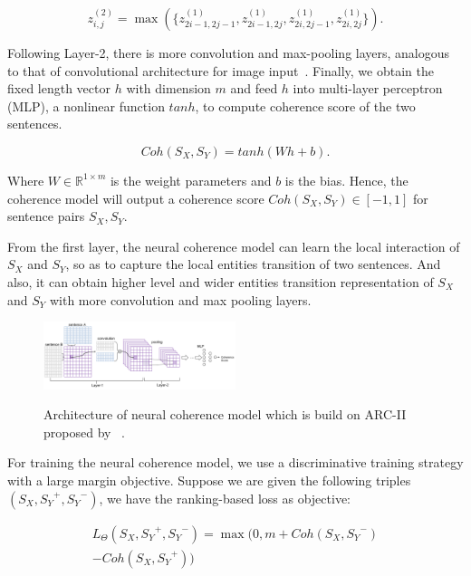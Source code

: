 \documentclass[letterpaper]{article} %
\begin{document}
	
	\begin{equation}
	z_{i,j}^{(2)} = \max(\{z_{2i-1,2j-1}^{(1)}, z_{2i-1,2j}^{(1)},z_{2i,2j-1}^{(1)},z_{2i,2j}^{(1)}\}). 
	\label{e:2dpool}
	\end{equation}
	
	Following Layer-2, there is more convolution and  max-pooling layers, analogous to that of convolutional architecture for image input~\cite{cnn}. Finally, we obtain the fixed length vector $h$ with dimension $m$ and feed $h$ into multi-layer perceptron (MLP), a nonlinear function $tanh$, to compute coherence score of the two sentences.
	
	\begin{equation}
	Coh(S_X,S_Y) = tanh(W  h+b). 
	\end{equation}
	
	\noindent Where  $ W \in \mathbb{R}^{1 \times m}$ is the weight parameters and $b$ is the bias. Hence, the coherence model will output a coherence score  $Coh(S_X, S_Y) \in [-1,1]$ for sentence pairs $S_X, S_Y$.
	
	
	From the first layer, the neural coherence model can learn the local interaction of $S_X$ and $S_Y$, so as to capture the local entities transition of two sentences.  And also, it can obtain higher level and wider entities transition representation of $S_X$ and $S_Y$ with more convolution and max pooling layers.
	
	\begin{figure}
		\includegraphics[width=0.5\textwidth]{./images/coherence.png}
		\label{coherence}
		\caption{Architecture of neural coherence model which is build on ARC-II proposed by ~\cite{NIPS2014_hu}.}
	\end{figure}
	
	
	For training the neural coherence model, we use a discriminative training strategy with a large margin objective. 
	Suppose we are given the following triples $(S_X, {S_Y}^{+},{S_Y}^{-})$, we have the ranking-based loss as objective:
	
	\begin{equation}
	\begin{split}
	L_\Theta({S_X}, {S_Y}^+, {S_Y}^-) = 
	\max(0, m+Coh({S_X, {S_Y}^-})\\
	-Coh({S_X}, {S_Y}^+))
	\end{split}
	\label{equation-objective}
	\end{equation}
	
\end{document}
